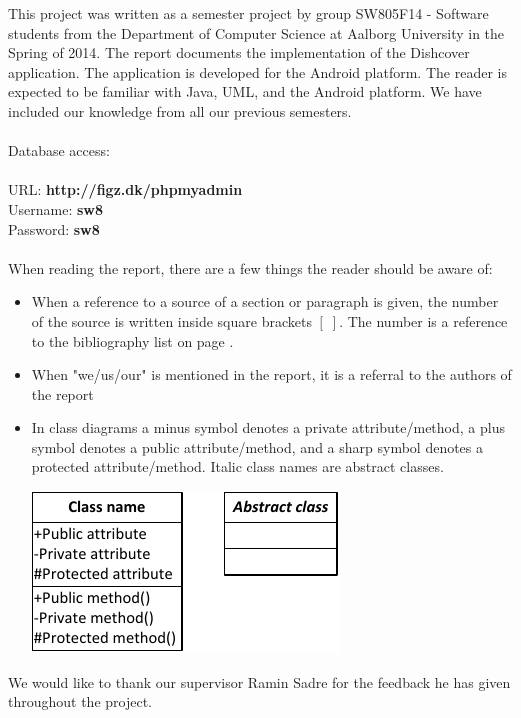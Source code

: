 This project was written as a semester project by group SW805F14 - Software students from the Department of Computer Science at Aalborg University in the Spring of 2014. The report documents the implementation of the Dishcover application. The application is developed for the Android platform. The reader is expected to be familiar with Java, UML, and the Android platform. We have included our knowledge from all our previous semesters.
\\\\
Database access:\\\\
URL: \textbf{http://figz.dk/phpmyadmin}\\
Username: \textbf{sw8}\\
Password: \textbf{sw8}\\\\
When reading the report, there are a few things the reader should be aware of:
\begin{itemize}
\item When a reference to a source of a section or paragraph is given, the number of the source is written inside square brackets $[\;]$. The number is a reference to the bibliography list on page \pageref{chap:bib}.
\item When "we/us/our" is mentioned in the report, it is a referral to the authors of the report
\item In class diagrams a minus symbol denotes a private attribute/method, a plus symbol denotes a public attribute/method, and a sharp symbol denotes a protected attribute/method. Italic class names are abstract classes.
\begin{center}
\includegraphics[width=0.35\linewidth]{img/umltheory.pdf}
\end{center}
\end{itemize}

We would like to thank our supervisor Ramin Sadre for the feedback he has given throughout the project.